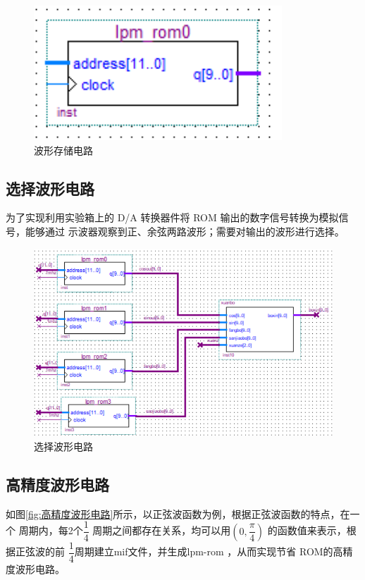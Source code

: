 \documentclass[twoside, openright]{article}
\begin{document}
\begin{figure}[htbp]
	\centering
	\includegraphics[width=0.4\linewidth]{lpm-rom.png}
	\caption{波形存储电路}
	\label{fig:波形存储电路}
\end{figure}

\subsection{选择波形电路}%
\label{sub:选择波形电路}

为了实现利用实验箱上的 D/A 转换器件将 ROM 输出的数字信号转换为模拟信号，能够通过
示波器观察到正、余弦两路波形；需要对输出的波形进行选择。


\begin{figure}[htbp]
	\centering
	\includegraphics[width = 0.7\linewidth]{select.png}
	\caption{选择波形电路}
	\label{fig:选择波形电路}
\end{figure}

\subsection{高精度波形电路}%
\label{sub:高精度波形电路}

如图\ref{fig:高精度波形电路}所示，以正弦波函数为例，根据正弦波函数的特点，在一个
周期内，每2个$ \dfrac{1}{4} $ 周期之间都存在关系，均可以用$ (0, \dfrac{\pi }{4})
$ 的函数值来表示，根据正弦波的前 $ \dfrac{1}{4} $周期建立mif文件，并生成lpm-rom
，从而实现节省 ROM的高精度波形电路。
\end{document}
